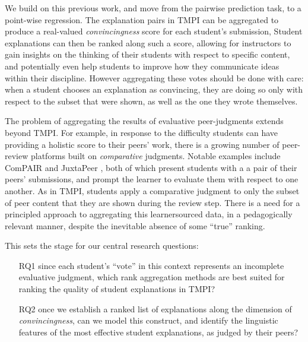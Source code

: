 \documentclass[notitlepage,12pt]{jedm}
\begin{document}
We build on this previous work, and move from the pairwise prediction task, to 
a point-wise regression. 
The explanation pairs in TMPI can be aggregated to produce a real-valued 
\textit{convincingness} score for each student's submission, 
Student explanations can then be ranked along such a score, allowing for 
instructors to gain insights on the thinking of their students with respect to 
specific content, and potentially even help students to improve how they 
communicate ideas within their discipline.
However aggregating these votes should be done with care: when a student 
chooses an explanation as convincing, they are doing so only with respect to 
the subset that were shown, as well as the one they wrote themselves.

The problem of aggregating the results of evaluative peer-judgments extends  
beyond TMPI.
For example, in response to the difficulty students can have providing a 
holistic score to their peers' work, there is a growing number of peer-review 
platforms built on \textit{comparative} judgments.
Notable examples include ComPAIR \cite{potter_compair:_2017} and 
JuxtaPeer \cite{cambre_juxtapeer:_2018}, both of which present students with a 
a pair of their peers' submissions, and prompt the learner to evaluate 
them with respect to one another.
As in TMPI, students apply a comparative judgment to only the subset of peer 
content that they are shown during the review step.
There is a need for a principled approach to aggregating this learnersourced 
data, in a pedagogically relevant manner, despite the inevitable absence of 
some ``true'' ranking.

This sets the stage for our central research questions: 
\begin{itemize}
	\item[RQ1] since each student's ``vote'' in this context represents an 
	incomplete evaluative judgment, which rank aggregation 
	methods are best suited for ranking the quality of student 
	explanations in TMPI?
	\item[RQ2] once we establish a ranked list of explanations along the 
	dimension of \textit{convincingness}, can we model this construct, and 
	identify the linguistic features of the most effective student 
	explanations, as judged by their peers?
\end{itemize}

\end{document}
